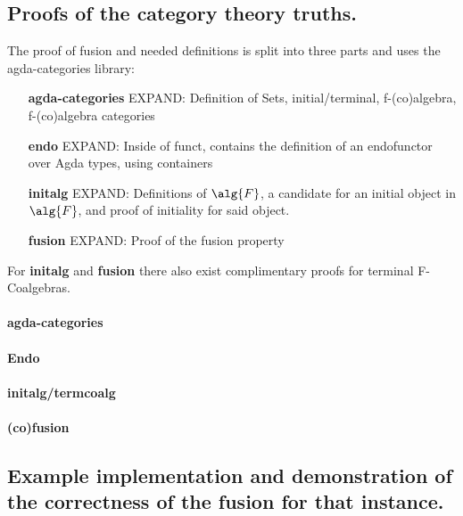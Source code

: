 \subsection{Proofs of the category theory truths.}\label{sec:cat_truths}
The proof of fusion and needed definitions is split into three parts and uses the agda-categories library: %
\begin{itemize}
    \item[\textbf{agda-categories}] EXPAND: Definition of Sets, initial/terminal, f-(co)algebra, f-(co)algebra categories
    \item[\textbf{endo}] EXPAND: Inside of funct, contains the definition of an endofunctor over Agda types, using containers
    \item[\textbf{initalg}] EXPAND: Definitions of $\alg{F}$, a candidate for an initial object in $\alg{F}$, and proof of initiality for said object.
    \item[\textbf{fusion}] EXPAND: Proof of the fusion property
\end{itemize}
For \textbf{initalg} and \textbf{fusion} there also exist complimentary proofs for terminal F-Coalgebras.

\paragraph{agda-categories}
\paragraph{Endo}
\paragraph{initalg/termcoalg}
\paragraph{(co)fusion}


\subsection{Example implementation and demonstration of the correctness of the fusion for that instance.}
\fi



\iffalse
Outline:
- Harper's work has some mathematics in it, I formalized it.
- The formalization was done in two parts:
  - The formalization of the mathematics itself
  - The formalization of the mathematics, embedded in categories to leverage the fusion property
- The Formalization also implemented an example datastructure to demonstrate the proof's applicability in practice.
\fi

